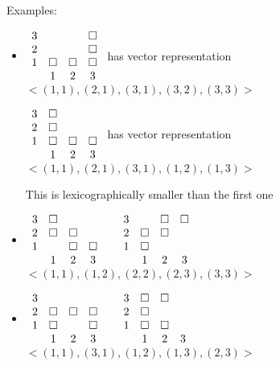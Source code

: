\documentclass[11pt]{article}
\begin{document}
Examples:
\begin{itemize}
\item $
\begin{array}{l c c c}
3 & & & \square \\
2 & & & \square \\
1 & \square & \square & \square \\
& 1 & 2 & 3 \\
\end{array}
$
has vector representation $ <(1, 1), (2, 1), (3, 1), (3, 2), (3, 3)> $

$
\begin{array}{l c c c}
3 & \square \\
2 & \square \\
1 & \square & \square & \square \\
& 1 & 2 & 3 \\
\end{array}
$
has vector representation
$  <(1, 1), (2, 1), (3, 1), (1, 2), (1, 3)> $

This is lexicographically smaller than the first one

\item 
$
\begin{array}{l c c c}
3 & \square \\
2 & \square & \square \\
1 & & \square & \square \\
& 1 & 2 & 3 \\
\end{array}
~~~~
\begin{array}{l c c c}
3 & & \square & \square \\
2 & \square & \square \\
1 & \square \\
& 1 & 2 & 3 \\
\end{array}
$
$ <(1, 1), (1, 2), (2, 2), (2, 3), (3, 3)> $ \bigskip

\item
$
\begin{array}{l c c c}
3 \\
2 & \square & \square & \square \\
1 & \square & & \square \\
& 1 & 2 & 3 \\
\end{array}
~~~~
\begin{array}{l c c c}
3 & \square & \square \\
2 & \square \\
1 & \square & \square \\
& 1 & 2 & 3 \\
\end{array}
$
$ <(1, 1), (3, 1), (1, 2), (1, 3), (2, 3)> $
\end{itemize}
\end{document}
